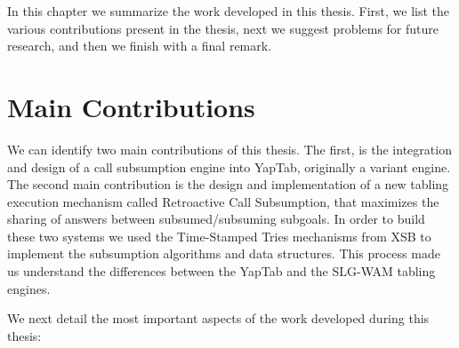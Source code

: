 
In this chapter we summarize the work developed in this thesis. First, we list the various contributions
present in the thesis, next we suggest problems for future research, and then we finish with a final
remark.

\section{Main Contributions}

We can identify two main contributions of this thesis. The first, is the integration and design of a call
subsumption engine into YapTab, originally a variant engine. The second main contribution is the design and implementation
of a new tabling execution mechanism called Retroactive Call Subsumption, that maximizes the sharing of answers
between subsumed/subsuming subgoals.
In order to build these two systems we used the Time-Stamped Tries mechanisms from XSB to implement the
subsumption algorithms and data structures. This process made us understand the differences between the
YapTab and the SLG-WAM tabling engines.

We next detail the most important aspects of the work developed during this thesis:

